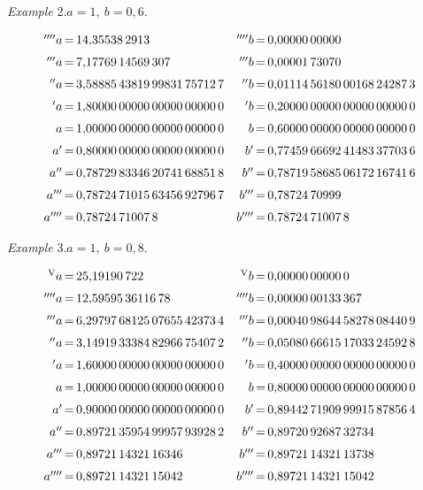\begin{center}\textit{Example} 2.\quad $a=1,\ b=0{,}6$.\end{center}
\begingroup\small\setlength{\arraycolsep}{0pt}
\[\begin{array}{r@{\,=\,}l@{\quad}r@{\,=\,}l}
{}^{\prime\prime\prime\prime}a&14{,}35538\,2913&{}^{\prime\prime\prime\prime}b&0{,}00000\,00000\\[6pt]
{}^{\prime\prime\prime}a&7{,}17769\,14569\,307&{}^{\prime\prime\prime}b&0{,}00001\,73070\\[6pt]
{}^{\prime\prime}a&3{,}58885\,43819\,99831\,75712\,7&{}^{\prime\prime}b&0{,}01114\,56180\,00168\,24287\,3\\[6pt]
{}^{\prime}a&1{,}80000\,00000\,00000\,00000\,0&{}^{\prime}b&0{,}20000\,00000\,00000\,00000\,0\\[6pt]
a&1{,}00000\,00000\,00000\,00000\,0&b&0{,}60000\,00000\,00000\,00000\,0\\[6pt]
a'&0{,}80000\,00000\,00000\,00000\,0&b'&0{,}77459\,66692\,41483\,37703\,6\\[6pt]
a''&0{,}78729\,83346\,20741\,68851\,8&b''&0{,}78719\,58685\,06172\,16741\,6\\[6pt]
a'''&0{,}78724\,71015\,63456\,92796\,7&b'''&0{,}78724\,70999\\[6pt]
a''''&0{,}78724\,71007\,8&b''''&0.78724\,71007\,8
\end{array}
\]\endgroup
{}
\begin{center}\textit{Example} 3.\quad $a=1,\ b=0{,}8$.\end{center}
\begingroup\small\setlength{\arraycolsep}{0pt}
\[\begin{array}{r@{\,=\,}l@{\quad}r@{\,=\,}l}
{}^{\mathrm V}a&25{,}19190\,722&{}^{\mathrm V}b&0{,}00000\,00000\,0\\[6pt]
{}^{\prime\prime\prime\prime}a&12{,}59595\,36116\,78&{}^{\prime\prime\prime\prime}b&0{,}00000\,00133\,367\\[6pt]
{}^{\prime\prime\prime}a&6{,}29797\,68125\,07655\,42373\,4&{}^{\prime\prime\prime}b&0{,}00040\,98644\,58278\,08440\,9\\[6pt]
{}^{\prime\prime}a&3{,}14919\,33384\,82966\,75407\,2&{}^{\prime\prime}b&0{,}05080\,66615\,17033\,24592\,8\\[6pt]
{}^{\prime}a&1{,}60000\,00000\,00000\,00000\,0&{}^{\prime}b&0{,}40000\,00000\,00000\,00000\,0\\[6pt]
a&1{,}00000\,00000\,00000\,00000\,0&b&0{,}80000\,00000\,00000\,00000\,0\\[6pt]
a'&0{,}90000\,00000\,00000\,00000\,0&b'&0{,}89442\,71909\,99915\,87856\,4\\[6pt]
a''&0{,}89721\,35954\,99957\,93928\,2&b''&0{,}89720\,92687\,32734\\[6pt]
a'''&0{,}89721\,14321\,16346&b'''&0{,}89721\,14321\,13738\\[6pt]
a''''&0{,}89721\,14321\,15042&b''''&0{,}89721\,14321\,15042
\end{array}
\]\endgroup

